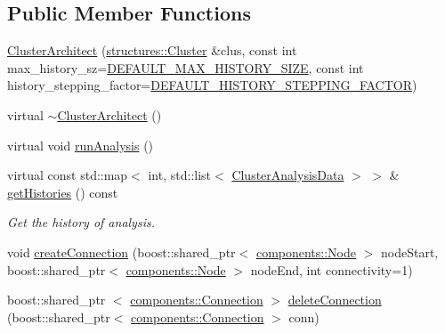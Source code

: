 \subsection*{\-Public \-Member \-Functions}
\begin{DoxyCompactItemize}
\item 
\hyperlink{classcryomesh_1_1manipulators_1_1ClusterArchitect_a943322d4216479bb2a789de252c9e832}{\-Cluster\-Architect} (\hyperlink{classcryomesh_1_1structures_1_1Cluster}{structures\-::\-Cluster} \&clus, const int max\-\_\-history\-\_\-sz=\hyperlink{classcryomesh_1_1manipulators_1_1ClusterArchitect_aedfa4722a69f72fcb1a9094dd584495d}{\-D\-E\-F\-A\-U\-L\-T\-\_\-\-M\-A\-X\-\_\-\-H\-I\-S\-T\-O\-R\-Y\-\_\-\-S\-I\-Z\-E}, const int history\-\_\-stepping\-\_\-factor=\hyperlink{classcryomesh_1_1manipulators_1_1ClusterArchitect_ab79a6ae93e47eaf107d78ed558f41d83}{\-D\-E\-F\-A\-U\-L\-T\-\_\-\-H\-I\-S\-T\-O\-R\-Y\-\_\-\-S\-T\-E\-P\-P\-I\-N\-G\-\_\-\-F\-A\-C\-T\-O\-R})
\item 
virtual \hyperlink{classcryomesh_1_1manipulators_1_1ClusterArchitect_aaa98287d6353166d890d0e9b862cc915}{$\sim$\-Cluster\-Architect} ()
\item 
virtual void \hyperlink{classcryomesh_1_1manipulators_1_1ClusterArchitect_a7e11839aa729d0e39bc055621d058d88}{run\-Analysis} ()
\item 
virtual const std\-::map$<$ int, \*
std\-::list$<$ \hyperlink{classcryomesh_1_1manipulators_1_1ClusterAnalysisData}{\-Cluster\-Analysis\-Data} $>$ $>$ \& \hyperlink{classcryomesh_1_1manipulators_1_1ClusterArchitect_a7bd6b5860a9aeb18a294f7d36bf252dd}{get\-Histories} () const 
\begin{DoxyCompactList}\small\item\em \-Get the history of analysis. \end{DoxyCompactList}\item 
void \hyperlink{classcryomesh_1_1manipulators_1_1ClusterArchitect_a1ea67e03b3ac0717d8e01a57453f0f7b}{create\-Connection} (boost\-::shared\-\_\-ptr$<$ \hyperlink{classcryomesh_1_1components_1_1Node}{components\-::\-Node} $>$ node\-Start, boost\-::shared\-\_\-ptr$<$ \hyperlink{classcryomesh_1_1components_1_1Node}{components\-::\-Node} $>$ node\-End, int connectivity=1)
\item 
boost\-::shared\-\_\-ptr\*
$<$ \hyperlink{classcryomesh_1_1components_1_1Connection}{components\-::\-Connection} $>$ \hyperlink{classcryomesh_1_1manipulators_1_1ClusterArchitect_a9e79e7b5195234ce9b1734ba51b97f2e}{delete\-Connection} (boost\-::shared\-\_\-ptr$<$ \hyperlink{classcryomesh_1_1components_1_1Connection}{components\-::\-Connection} $>$ conn)

\end{DoxyCompactItemize}
